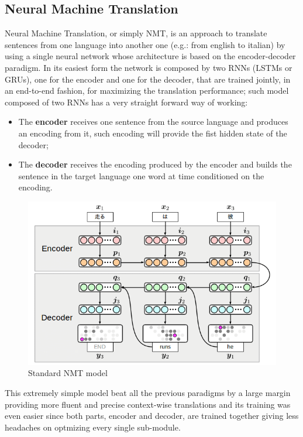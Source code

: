 \subsection{Neural Machine Translation}\label{subsec:NMT}
Neural Machine Translation, or simply NMT, is an approach to translate sentences from one language into another one (e.g.: from english to italian) by using a single neural network whose architecture is based on the encoder-decoder paradigm.
In its easiest form the network is composed by two RNNs (LSTMs or GRUs), one for the encoder and one for the decoder, that are trained jointly, in an end-to-end fashion, for maximizing the translation performance; such model composed of two RNNs has a very straight forward way of working:
\begin{itemize}
    \item The \textbf{encoder} receives one sentence from the source language and produces an encoding from it, such encoding will provide the fist hidden state of the decoder;
    \item The \textbf{decoder} receives the encoding produced by the encoder and builds the sentence in the target language one word at time conditioned on the encoding.
\end{itemize}
\begin{figure}[H]%
    \centering
    \includegraphics[width=0.65\linewidth]{images/seq2seq.png}
    \caption{Standard NMT model}
    \label{fig:NMT_model}
\end{figure}
This extremely simple model beat all the previous paradigms by a large margin providing more fluent and precise context-wise translations and its training was even easier since both parts, encoder and decoder, are trained together giving less headaches on optmizing every single sub-module.
